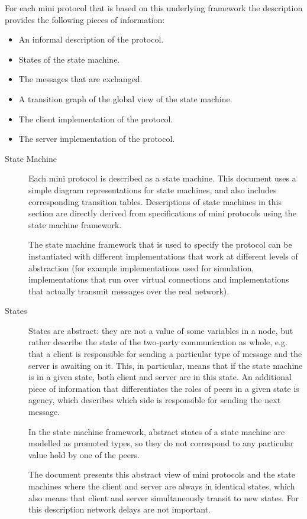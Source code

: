 For each mini protocol that is based on this underlying framework the description provides the
following pieces of information:

\begin{itemize}
\item An informal description of the protocol.
\item States of the state machine.
\item The messages that are exchanged.
\item A transition graph of the global view of the state machine.
\item The client implementation of the protocol.
\item The server implementation of the protocol.
\end{itemize}

\begin{description}
\item[State Machine]
  Each mini protocol is described as a state machine.
  This document uses a simple diagram representations for state machines, and
  also includes corresponding transition tables.
  Descriptions of state machines in this section are directly derived from
  specifications of mini protocols using the state machine framework.

  The state machine framework that is used to specify the protocol can be instantiated
  with different implementations that work at different levels of abstraction
  (for example implementations used for simulation, implementations that run over virtual
  connections and implementations that actually transmit messages over the real network).


\item[States]
  States are abstract: they are not a value of some variables in a node, but
  rather describe the state of the two-party communication as whole, e.g.
  that a client is responsible for sending a particular type of message and
  the server is awaiting on it.  This, in particular, means that if the state
  machine is in a given state, both client and server are in this state.
  An additional piece of information that differentiates the roles of peers in
  a given state is agency, which describes which side is responsible for
  sending the next message.

  In the state machine framework, abstract states of a state machine are
  modelled as promoted types, so they do not correspond to any particular
  value hold by one of the peers.

  The document presents this abstract view of mini protocols and the state
  machines where the client and server are always in identical states, which
  also means that client and server simultaneously transit to new states.
  For this description network delays are not important.


\end{description}
